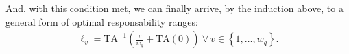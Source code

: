 \documentclass[hidelinks, nonatbib]{elsarticle}
\begin{document}
\begin{enumerate}
And, with this condition met, we can finally arrive, by the induction above, to a general form of optimal responsability ranges:
\begin{gather}
    \ell_v
    =
    \text{TA}^{-1}\left(
        \frac{v}{w_q}
        +
        \text{TA}(0)
    \right)
    \
    \forall
    \
    v \in 
    \left\{
        1, \dots, w_q
    \right\}
    .
\end{gather}





\end{enumerate}
\end{document}
